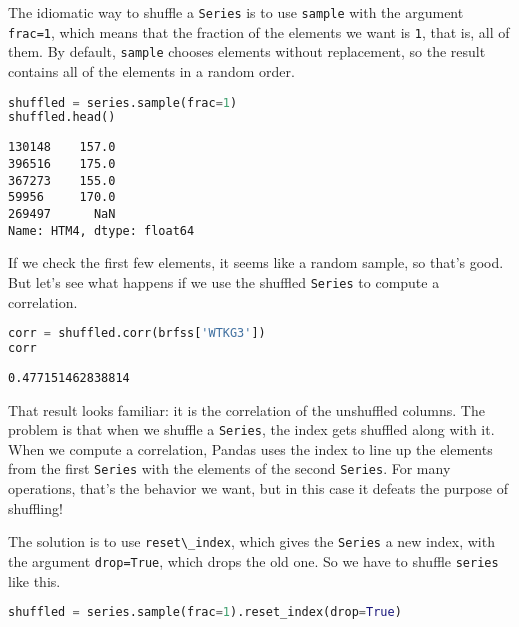The idiomatic way to shuffle a \passthrough{\lstinline!Series!} is to
use \passthrough{\lstinline!sample!} with the argument
\passthrough{\lstinline!frac=1!}, which means that the fraction of the
elements we want is \passthrough{\lstinline!1!}, that is, all of them.
By default, \passthrough{\lstinline!sample!} chooses elements without
replacement, so the result contains all of the elements in a random
order.

\begin{lstlisting}[language=Python,style=source]
shuffled = series.sample(frac=1)
shuffled.head()
\end{lstlisting}

\begin{lstlisting}[style=output]
130148    157.0
396516    175.0
367273    155.0
59956     170.0
269497      NaN
Name: HTM4, dtype: float64
\end{lstlisting}

If we check the first few elements, it seems like a random sample, so
that's good. But let's see what happens if we use the shuffled
\passthrough{\lstinline!Series!} to compute a correlation.

\begin{lstlisting}[language=Python,style=source]
corr = shuffled.corr(brfss['WTKG3'])
corr
\end{lstlisting}

\begin{lstlisting}[style=output]
0.477151462838814
\end{lstlisting}

That result looks familiar: it is the correlation of the unshuffled
columns. The problem is that when we shuffle a
\passthrough{\lstinline!Series!}, the index gets shuffled along with it.
When we compute a correlation, Pandas uses the index to line up the
elements from the first \passthrough{\lstinline!Series!} with the
elements of the second \passthrough{\lstinline!Series!}. For many
operations, that's the behavior we want, but in this case it defeats the
purpose of shuffling!

The solution is to use \passthrough{\lstinline!reset\_index!}, which
gives the \passthrough{\lstinline!Series!} a new index, with the
argument \passthrough{\lstinline!drop=True!}, which drops the old one.
So we have to shuffle \passthrough{\lstinline!series!} like this.

\begin{lstlisting}[language=Python,style=source]
shuffled = series.sample(frac=1).reset_index(drop=True)
\end{lstlisting}

